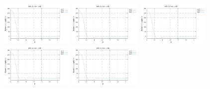 \noindent
\includegraphics[width=3.5cm]{python_codes/fieldstone_152/RESULTS/exp3/d_t_32_m2}
\includegraphics[width=3.5cm]{python_codes/fieldstone_152/RESULTS/exp3/d_t_32_m3}
\includegraphics[width=3.5cm]{python_codes/fieldstone_152/RESULTS/exp3/d_t_32_m4}
\includegraphics[width=3.5cm]{python_codes/fieldstone_152/RESULTS/exp3/d_t_32_m5}
\includegraphics[width=3.5cm]{python_codes/fieldstone_152/RESULTS/exp3/d_t_32_m6}

